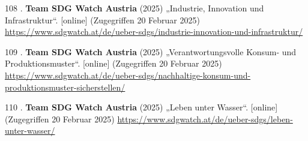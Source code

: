 \documentclass[
    headings=optiontotocandhead,%
    twoside,
    numbers=noenddot,%
    12pt, %
    titlepage, %
    parskip=full, %
    listof=leveldown, 
    numbers=noenddot, %
    a4paper,DIV=14,
    BCOR=15mm,
]{scrbook}
\makeatletter
\newcommand*{\authormark}{}
\newcommand*{\the@orig@section}{}
\let\the@orig@section\section
\renewcommand*{\section}{%
  \clearpage
  \the@orig@section
}
\newlength{\cslhangindent}
\newenvironment{cslreferences}%
  {\setlength{\parindent}{0pt}%
  \everypar{\setlength{\hangindent}{\cslhangindent}}\ignorespaces}%
  {\par}
\makeatother
\begin{document}
\begin{cslreferences}
\leavevmode\hypertarget{ref-sdg9}{}%
108 . \textbf{Team SDG Watch Austria} (2025) „Industrie, Innovation und
Infrastruktur``. {[}online{]} (Zugegriffen 20 Februar 2025)
\url{https://www.sdgwatch.at/de/ueber-sdgs/industrie-innovation-und-infrastruktur/}

\leavevmode\hypertarget{ref-sdg12}{}%
109 . \textbf{Team SDG Watch Austria} (2025) „Verantwortungs­volle
Konsum- und Produktions­muster``. {[}online{]} (Zugegriffen 20 Februar
2025)
\url{https://www.sdgwatch.at/de/ueber-sdgs/nachhaltige-konsum-und-produktionsmuster-sicherstellen/}

\leavevmode\hypertarget{ref-sdg14}{}%
110 . \textbf{Team SDG Watch Austria} (2025) „Leben unter Wasser``.
{[}online{]} (Zugegriffen 20 Februar 2025)
\url{https://www.sdgwatch.at/de/ueber-sdgs/leben-unter-wasser/}
\end{cslreferences}

\renewcommand{\authormark}{}%
\cleardoublepage{}




\translatelet{}
\section{\app}
\end{document}
